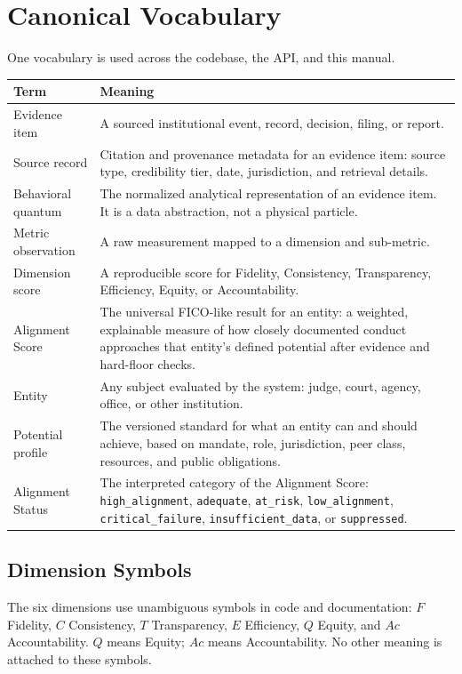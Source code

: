 \section{Canonical Vocabulary}

One vocabulary is used across the codebase, the API, and this manual.

\begin{center}
\begin{longtable}{p{4.4cm} p{10.5cm}}
\toprule
\textbf{Term} & \textbf{Meaning} \\
\midrule
\endhead
Evidence item & A sourced institutional event, record, decision, filing, or report. \\
Source record & Citation and provenance metadata for an evidence item: source type, credibility tier, date, jurisdiction, and retrieval details. \\
Behavioral quantum & The normalized analytical representation of an evidence item. It is a data abstraction, not a physical particle. \\
Metric observation & A raw measurement mapped to a dimension and sub-metric. \\
Dimension score & A reproducible score for Fidelity, Consistency, Transparency, Efficiency, Equity, or Accountability. \\
Alignment Score & The universal FICO-like result for an entity: a weighted, explainable measure of how closely documented conduct approaches that entity's defined potential after evidence and hard-floor checks. \\
Entity & Any subject evaluated by the system: judge, court, agency, office, or other institution. \\
Potential profile & The versioned standard for what an entity can and should achieve, based on mandate, role, jurisdiction, peer class, resources, and public obligations. \\
Alignment Status & The interpreted category of the Alignment Score: \texttt{high\_alignment}, \texttt{adequate}, \texttt{at\_risk}, \texttt{low\_alignment}, \texttt{critical\_failure}, \texttt{insufficient\_data}, or \texttt{suppressed}. \\
\bottomrule
\end{longtable}
\end{center}

\subsection{Dimension Symbols}

The six dimensions use unambiguous symbols in code and documentation:
\(F\) Fidelity, \(C\) Consistency, \(T\) Transparency, \(E\) Efficiency,
\(Q\) Equity, and \(Ac\) Accountability. \(Q\) means Equity; \(Ac\) means
Accountability. No other meaning is attached to these symbols.
